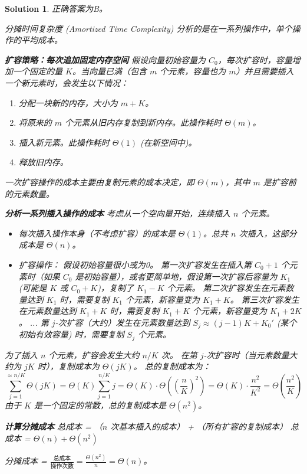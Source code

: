 \documentclass[UTF8]{report}
\newtheorem{solution}{Solution}
\theoremstyle{MyLineTheoremStyle} %
\theoremstyle{MyBlockTheoremStyle} %
\theoremstyle{MySubsubsectionStyle} %
\begin{document}
\begin{solution}
正确答案为B。

分摊时间复杂度 (Amortized Time Complexity) 分析的是在一系列操作中，单个操作的平均成本。

\textbf{扩容策略：每次追加固定内存空间}
假设向量初始容量为 $C_0$，每次扩容时，容量增加一个固定的量 $K$。当向量已满（包含 $m$ 个元素，容量也为 $m$）并且需要插入一个新元素时，会发生以下情况：
\begin{enumerate}
    \item 分配一块新的内存，大小为 $m+K$。
    \item 将原来的 $m$ 个元素从旧内存复制到新内存。此操作耗时 $\Theta(m)$。
    \item 插入新元素。此操作耗时 $\Theta(1)$ (在新空间中)。
    \item 释放旧内存。
\end{enumerate}
一次扩容操作的成本主要由复制元素的成本决定，即 $\Theta(m)$，其中 $m$ 是扩容前的元素数量。

\textbf{分析一系列插入操作的成本}
考虑从一个空向量开始，连续插入 $n$ 个元素。
\begin{itemize}
    \item 每次插入操作本身（不考虑扩容）的成本是 $\Theta(1)$。总共 $n$ 次插入，这部分成本是 $\Theta(n)$。
    \item 扩容操作：
    假设初始容量很小或为0。
    第一次扩容发生在插入第 $C_0+1$ 个元素时（如果 $C_0$ 是初始容量），或者更简单地，假设第一次扩容后容量为 $K_1$ (可能是 $K$ 或 $C_0+K$)，复制了 $K_1-K$ 个元素。
    第二次扩容发生在元素数量达到 $K_1$ 时，需要复制 $K_1$ 个元素，新容量变为 $K_1+K$。
    第三次扩容发生在元素数量达到 $K_1+K$ 时，需要复制 $K_1+K$ 个元素，新容量变为 $K_1+2K$。
    ...
    第 $j$-次扩容（大约）发生在元素数量达到 $S_j \approx (j-1)K + K_0'$ (某个初始有效容量) 时，需要复制 $S_j$ 个元素。
\end{itemize}
为了插入 $n$ 个元素，扩容会发生大约 $n/K$ 次。
在第 $j$-次扩容时（当元素数量大约为 $jK$ 时），复制成本为 $\Theta(jK)$。
总的复制成本为：
$$ \sum_{j=1}^{\approx n/K} \Theta(jK) = \Theta(K) \sum_{j=1}^{n/K} j = \Theta(K) \cdot \Theta\left(\left(\frac{n}{K}\right)^2\right) = \Theta(K) \cdot \frac{n^2}{K^2} = \Theta\left(\frac{n^2}{K}\right) $$
由于 $K$ 是一个固定的常数，总的复制成本是 $\Theta(n^2)$。

\textbf{计算分摊成本}
总成本 = （$n$ 次基本插入的成本） + （所有扩容的复制成本）
总成本 = $\Theta(n) + \Theta(n^2)$

分摊成本 = $\frac{\text{总成本}}{\text{操作次数}} = \frac{\Theta(n^2)}{n} = \Theta(n)$。


\end{solution}
\end{document}

